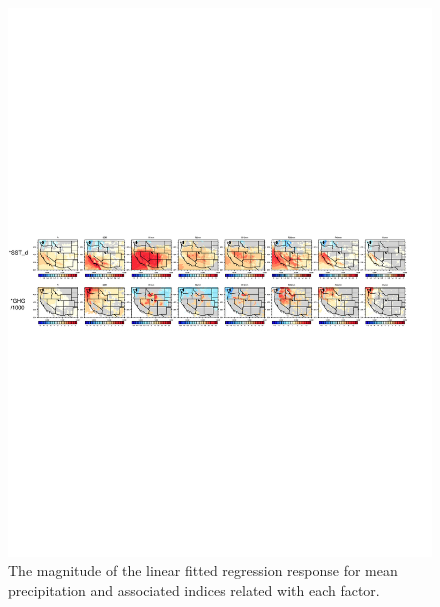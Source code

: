 \documentclass{ametsoc}
\begin{document}
\begin{figure}
\begin{center}
\includegraphics[width=6in]{wd_lmfit_coef_enso_ghg.pdf}
\caption{The magnitude of the linear fitted regression response for mean precipitation and associated indices related with each factor.}
\end{center}
\label{fig:S7}
\end{figure}
\end{document}
